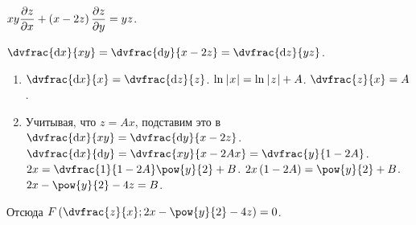 \documentclass[a5paper,10pt]{article}
\begin{document}
    $xy \dfrac{\partial z}{\partial x} + \left(\hspace{0.01em}x - 2z\hspace{0.01em}\right) \dfrac{\partial z}{\partial y} = yz$.

    $\dvfrac{\di x}{xy} = \dvfrac{\di y}{x - 2z} = \dvfrac{\di z}{yz}$.

    \begin{enumerate}
        \item $\dvfrac{\di x}{x} = \dvfrac{\di z}{z}$.
        $\ln\hspace{0.2mm}\left|\hspace{0.06em}x\hspace{0.06em}\right| = \ln\hspace{0.2mm}\left|\hspace{0.06em}z\hspace{0.06em}\right| + A$.
        $\dvfrac{z}{x} = A$.
        \item Учитывая, что $z = Ax$, подставим это в
        $\dvfrac{\di x}{xy} = \dvfrac{\di y}{x - 2z}$.
        $\dvfrac{\di x}{\di y} = \dvfrac{xy}{x - 2Ax} = \dvfrac{y}{1 - 2A}$.
        $2x = \dvfrac{1}{1 - 2A} \pow{y}{2} + B$.
        $2x \br{1 - 2A} = \pow{y}{2} + B$.
        $2x - \pow{y}{2} - 4z = B$.
    \end{enumerate}

    Отсюда $F\br{\dvfrac{z}{x}; 2x - \pow{y}{2} - 4z} = 0$.
\end{document}
